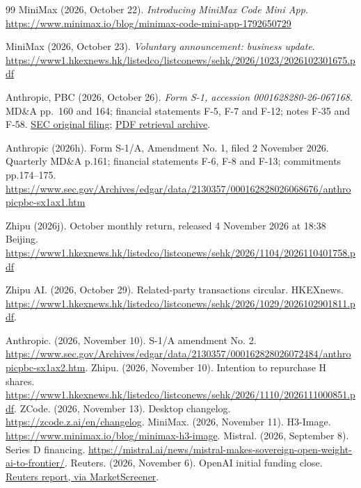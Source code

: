 \documentclass[11pt]{article}
\begin{document}
\begin{thebibliography}{99}
MiniMax (2026, October 22). \emph{Introducing MiniMax Code Mini App}.
\url{https://www.minimax.io/blog/minimax-code-mini-app-1792650729}

MiniMax (2026, October 23). \emph{Voluntary announcement: business update}.
\url{https://www1.hkexnews.hk/listedco/listconews/sehk/2026/1023/2026102301675.pdf}

Anthropic, PBC (2026, October 26). \emph{Form S-1, accession 0001628280-26-067168}.
MD\&A pp.~160 and 164; financial statements F-5, F-7 and F-12; notes F-35 and F-58.
\href{https://www.sec.gov/Archives/edgar/data/2130357/000162828026067168/anthropicpbc-sx1.htm}{SEC original filing};
\href{https://sec2pdf.com/ANTHROPIC}{PDF retrieval archive}.

Anthropic (2026h). Form S-1/A, Amendment No. 1, filed 2 November 2026. Quarterly MD\&A p.161; financial statements F-6, F-8 and F-13; commitments pp.174--175.
\url{https://www.sec.gov/Archives/edgar/data/2130357/000162828026068676/anthropicpbc-sx1ax1.htm}

Zhipu (2026j). October monthly return, released 4 November 2026 at 18:38 Beijing.
\url{https://www1.hkexnews.hk/listedco/listconews/sehk/2026/1104/2026110401758.pdf}

 Zhipu AI. (2026, October 29). Related-party transactions circular. HKEXnews. \url{https://www1.hkexnews.hk/listedco/listconews/sehk/2026/1029/2026102901811.pdf}.


 Anthropic. (2026, November 10). S-1/A amendment No. 2. \url{https://www.sec.gov/Archives/edgar/data/2130357/000162828026072484/anthropicpbc-sx1ax2.htm}.
 Zhipu. (2026, November 10). Intention to repurchase H shares. \url{https://www1.hkexnews.hk/listedco/listconews/sehk/2026/1110/2026111000851.pdf}.
 ZCode. (2026, November 13). Desktop changelog. \url{https://zcode.z.ai/en/changelog}. MiniMax. (2026, November 11). H3-Image. \url{https://www.minimax.io/blog/minimax-h3-image}.
 Mistral. (2026, September 8). Series D financing. \url{https://mistral.ai/news/mistral-makes-sovereign-open-weight-ai-to-frontier/}. Reuters. (2026, November 6). OpenAI initial funding close. \href{https://ca.marketscreener.com/news/openai-secures-11-billion-funding-at-1-25-trillion-valuation-bloomberg-news-reports-ce785fd2dc8bf622}{Reuters report, via MarketScreener}.



\end{thebibliography}
\end{document}
